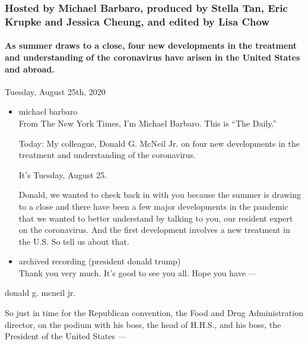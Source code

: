 \hypertarget{hosted-by-michael-barbaro-produced-by-stella-tan-eric-krupke-and-jessica-cheung-and-edited-by-lisa-chow}{%
\subsubsection{Hosted by Michael Barbaro, produced by Stella Tan, Eric
Krupke and Jessica Cheung, and edited by Lisa
Chow}\label{hosted-by-michael-barbaro-produced-by-stella-tan-eric-krupke-and-jessica-cheung-and-edited-by-lisa-chow}}

\hypertarget{as-summer-draws-to-a-close-four-new-developments-in-the-treatment-and-understanding-of-the-coronavirus-have-arisen-in-the-united-states-and-abroad}{%
\paragraph{As summer draws to a close, four new developments in the
treatment and understanding of the coronavirus have arisen in the United
States and
abroad.}\label{as-summer-draws-to-a-close-four-new-developments-in-the-treatment-and-understanding-of-the-coronavirus-have-arisen-in-the-united-states-and-abroad}}

Tuesday, August 25th, 2020

\begin{itemize}
\item
  michael barbaro\\
  From The New York Times, I'm Michael Barbaro. This is ``The Daily.''

  Today: My colleague, Donald G. McNeil Jr. on four new developments in
  the treatment and understanding of the coronavirus.

  It's Tuesday, August 25.

  Donald, we wanted to check back in with you because the summer is
  drawing to a close and there have been a few major developments in the
  pandemic that we wanted to better understand by talking to you, our
  resident expert on the coronavirus. And the first development involves
  a new treatment in the U.S. So tell us about that.
\item
  archived recording (president donald trump)\\
  Thank you very much. It's good to see you all. Hope you have ---
\end{itemize}

donald g. mcneil jr.

So just in time for the Republican convention, the Food and Drug
Administration director, on the podium with his boss, the head of
H.H.S., and his boss, the President of the United States ---

